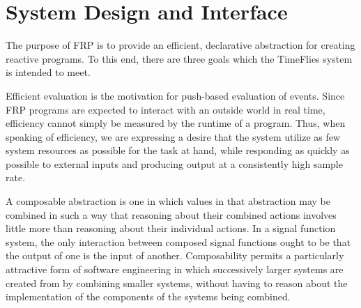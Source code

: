 \section{System Design and Interface}
\label{section:System_Design_and_Interface}

The purpose of FRP is to provide an efficient, declarative abstraction for creating
reactive programs. To this end, there are three goals which the TimeFlies
system is intended to meet. 

Efficient evaluation is the motivation for push-based evaluation of events.
Since FRP programs are expected to  interact with an outside world in real time,
efficiency cannot simply be measured by the runtime of a program. Thus, when speaking of efficiency,
we are expressing a desire that the system utilize as few system resources as possible
for the task at hand, while responding as quickly as possible to external inputs and
producing output at a consistently high sample rate.


A composable abstraction is one in which values in that abstraction may be
combined in such a way that reasoning about their combined actions involves
little more than reasoning about their individual actions. In a signal function
system, the only interaction between composed signal functions ought to be that
the output of one is the input of another. Composability permits a particularly
attractive form of software engineering in which successively larger systems are
created from by combining smaller systems, without having to reason about the 
implementation of the components of the systems being combined.


